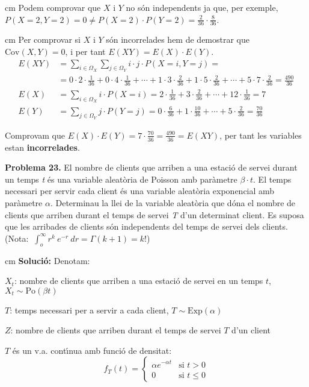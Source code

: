\documentclass{article}
\begin{document}
 cm
\noindent
Podem comprovar que $X$ i $Y$ no s\'on independents ja que, per exemple, 
$P(X=2, Y=2)=0 \neq P(X=2) \cdot P(Y=2) = \frac{2}{36} \cdot \frac{8}{36}$.

 cm
\noindent
Per comprovar si $X$ i $Y$ s\'on incorrelades hem de demostrar que $\mathrm{Cov}(X, Y)=0$, i per tant $E(XY)=E(X) \cdot E(Y)$.
\[
\begin{array}{rl}
E(XY) & =\sum_{i \in \Omega_X} \sum_{j \in \Omega_Y} i \cdot j \cdot P(X=i, Y=j) =  \\ 
      & =0 \cdot 2 \cdot \frac{1}{36} +  0 \cdot 4 \cdot \frac{1}{36} + \cdots + 
      1 \cdot 3 \cdot \frac{2}{36} + 1 \cdot 5 \cdot \frac{2}{36} + \cdots + 5 \cdot 7 \cdot \frac{2}{36}=\frac{490}{36} \\
E(X) &= \sum_{i \in \Omega_X} i \cdot P(X=i) = 2 \cdot \frac{1}{36} + 3 \cdot \frac{2}{36} + \cdots + 12 \cdot \frac{1}{36}=7 \\
E(Y) &= \sum_{j \in \Omega_Y} j \cdot P(Y=j) = 0 \cdot \frac{6}{36} + 1 \cdot \frac{10}{36} + \cdots + 5 \cdot \frac{2}{36}=\frac{70}{36}
\end{array}
\]      

\noindent
Comprovam que $E(X) \cdot E(Y)=7 \cdot \frac{70}{36}=\frac{490}{36}=E(XY)$, per tant les variables estan \textbf{incorrelades}.


\newpage
\noindent
\textbf{Problema 23.}
El nombre de clients que arriben a una estaci\'o de servei
durant un temps {\it t} \'es una variable aleat\`oria de Poisson amb
par\`ametre $\beta \cdot t.$ El temps necessari per servir cada
client \'es una variable aleat\`oria exponencial amb par\`ametre
$\alpha$. Determinau la llei de la variable aleat\`oria que d\'ona el
nombre de clients que arriben durant el temps de servei {\it T}
d'un determinat client. Es suposa que les arribades de clients s\'on
independents del temps de servei dels clients. (Nota: $
\displaystyle \> \int_o^\infty r^k \> e^{-r} \> dr = \Gamma(k+1) =
k!$)

 cm
\noindent
\textbf{Soluci\'o:} Denotam:

$X_t$: nombre de clients que arriben a una estaci\'o de servei en un temps $t$, $X_t \sim \mathrm{Po}(\beta t)$

$T$: temps necessari per a servir a cada client, $T \sim \mathrm{Exp}(\alpha)$

$Z$: nombre de clients que arriben durant el temps de servei $T$ d'un client


\noindent
$T$ \'es un v.a. cont\'\i nua amb funci\'o
de densitat:
\[
f_T(t)=\begin{cases} \alpha e^{-\alpha t} & \text{si } t > 0 \\ 0 & \text{si } t \leq 0 \end{cases} 
\]
\end{document}
